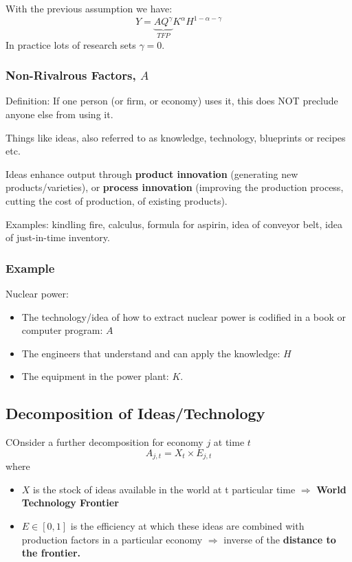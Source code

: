 \documentclass[11pt]{article}
\begin{document}
With the previous assumption we have:
\begin{equation}
    \label{Y QKH}
    Y = \underbrace{A Q^\gamma}_{TFP} K^\alpha H^{1-\alpha-\gamma}
\end{equation}
In practice lots of research sets $\gamma=0$.

\subsubsection{Non-Rivalrous Factors, $A$}

Definition: If one person (or firm, or economy) uses it, this does NOT preclude anyone else from using it.

Things like ideas, also referred to as knowledge, technology, blueprints or recipes etc.

Ideas enhance output through \textbf{product innovation} (generating new products/varieties), or \textbf{process innovation} (improving the production process, cutting the cost of production, of existing products).

Examples: kindling fire, calculus, formula for aspirin, idea of conveyor belt, idea of just-in-time inventory.

\subsubsection{Example}
Nuclear power:
\begin{itemize}
    \item The technology/idea of how to extract nuclear power is codified in a book or computer program: $A$
    \item The engineers that understand and can apply the knowledge: $H$
    \item The equipment in the power plant: $K$.
\end{itemize}

\subsection{Decomposition of Ideas/Technology}

COnsider a further decomposition for economy $j$ at time $t$
\[A_{j,t} = X_t \times E_{j,t}\]
where
\begin{itemize}
    \item $X$ is the stock of ideas available in the world at t particular time $\Rightarrow$ \textbf{World Technology Frontier}
    \item $E \in [0,1]$ is the efficiency at which these ideas are combined with production factors in a particular economy $\Rightarrow$ inverse of the \textbf{distance to the frontier.}
\end{itemize}
\end{document}
